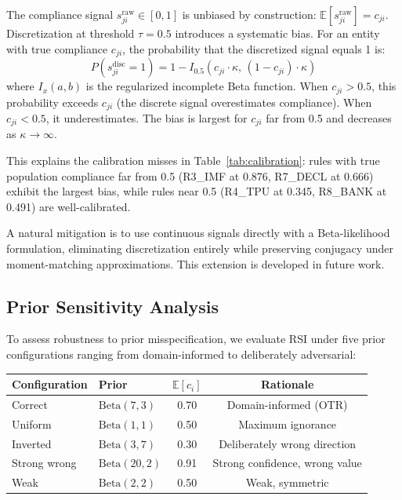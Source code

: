The compliance signal $s_{ji}^{\mathrm{raw}} \in [0,1]$ is unbiased
by construction:
$\mathbb{E}[s_{ji}^{\mathrm{raw}}] = c_{ji}$.
Discretization at threshold $\tau = 0.5$ introduces a systematic bias.
For an entity with true compliance $c_{ji}$, the probability that the
discretized signal equals 1 is:
\[
  P(s_{ji}^{\mathrm{disc}} = 1) =
  1 - I_{0.5}(c_{ji} \cdot \kappa,\, (1{-}c_{ji}) \cdot \kappa)
\]
where $I_x(a,b)$ is the regularized incomplete Beta function. When
$c_{ji} > 0.5$, this probability exceeds $c_{ji}$ (the discrete signal
overestimates compliance). When $c_{ji} < 0.5$, it underestimates.
The bias is largest for $c_{ji}$ far from 0.5 and decreases as
$\kappa \to \infty$.

This explains the calibration misses in Table~\ref{tab:calibration}:
rules with true population compliance far from 0.5 (R3\_IMF at 0.876,
R7\_DECL at 0.666) exhibit the largest bias, while rules near 0.5
(R4\_TPU at 0.345, R8\_BANK at 0.491) are well-calibrated.

A natural mitigation is to use continuous signals directly with a
Beta-likelihood formulation, eliminating discretization entirely while
preserving conjugacy under moment-matching approximations. This
extension is developed in future work.


\subsection{Prior Sensitivity Analysis}

To assess robustness to prior misspecification, we evaluate RSI under
five prior configurations ranging from domain-informed to deliberately
adversarial:

\begin{center}
\renewcommand{\arraystretch}{1.15}
\begin{tabular}{llcc}
\toprule
\textbf{Configuration} & \textbf{Prior} & $\mathbb{E}[c_i]$ & \textbf{Rationale} \\
\midrule
Correct       & $\mathrm{Beta}(7, 3)$ & 0.70 & Domain-informed (OTR) \\
Uniform       & $\mathrm{Beta}(1, 1)$ & 0.50 & Maximum ignorance \\
Inverted      & $\mathrm{Beta}(3, 7)$ & 0.30 & Deliberately wrong direction \\
Strong wrong  & $\mathrm{Beta}(20, 2)$ & 0.91 & Strong confidence, wrong value \\
Weak          & $\mathrm{Beta}(2, 2)$ & 0.50 & Weak, symmetric \\
\bottomrule
\end{tabular}
\end{center}

